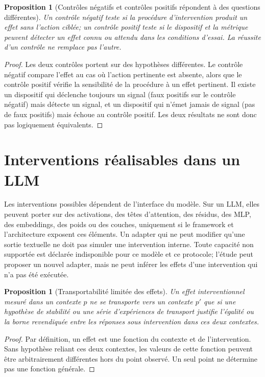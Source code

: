 \documentclass[11pt,oneside]{book}
\newtheorem{proposition}[theoreme]{Proposition}
\theoremstyle{definition}
\theoremstyle{remark}
\newcommand{\1}{\mathbf 1}
\begin{document}
\begin{proposition}[Contrôles négatifs et contrôles positifs répondent à des questions différentes]
Un contrôle négatif teste si la procédure d'intervention produit un effet sans l'action ciblée; un contrôle positif teste si le dispositif et la métrique peuvent détecter un effet connu ou attendu dans les conditions d'essai. La réussite d'un contrôle ne remplace pas l'autre.
\end{proposition}
\begin{proof}
Les deux contrôles portent sur des hypothèses différentes. Le contrôle négatif compare l'effet au cas où l'action pertinente est absente, alors que le contrôle positif vérifie la sensibilité de la procédure à un effet pertinent. Il existe un dispositif qui déclenche toujours un signal (faux positifs sur le contrôle négatif) mais détecte un signal, et un dispositif qui n'émet jamais de signal (pas de faux positifs) mais échoue au contrôle positif. Les deux résultats ne sont donc pas logiquement équivalents.\end{proof}

\section{Interventions réalisables dans un LLM}
Les interventions possibles dépendent de l'interface du modèle. Sur un LLM, elles peuvent porter sur des activations, des têtes d'attention, des résidus, des MLP, des embeddings, des poids ou des couches, uniquement si le framework et l'architecture exposent ces éléments. Un adapter qui ne peut modifier qu'une sortie textuelle ne doit pas simuler une intervention interne. Toute capacité non supportée est déclarée indisponible pour ce modèle et ce protocole; l'étude peut proposer un nouvel adapter, mais ne peut inférer les effets d'une intervention qui n'a pas été exécutée.

\begin{proposition}[Transportabilité limitée des effets]
Un effet interventionnel mesuré dans un contexte $p$ ne se transporte vers un contexte $p'$ que si une hypothèse de stabilité ou une série d'expériences de transport justifie l'égalité ou la borne revendiquée entre les réponses sous intervention dans ces deux contextes.
\end{proposition}
\begin{proof}
Par définition, un effet est une fonction du contexte et de l'intervention. Sans hypothèse reliant ces deux contextes, les valeurs de cette fonction peuvent être arbitrairement différentes hors du point observé. Un seul point ne détermine pas une fonction générale.\end{proof}
\end{document}
